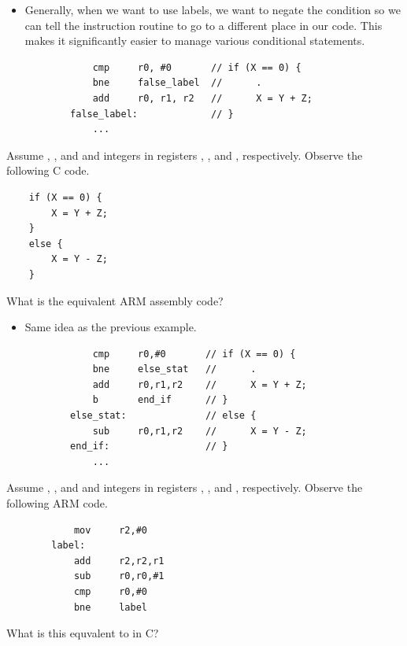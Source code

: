 \documentclass[letterpaper]{article}
\begin{document}
\begin{itemize}
    \item Generally, when we want to use labels, we want to negate the condition so we can tell the instruction routine to go to a different place in our code. This makes it significantly easier to manage various conditional statements. 
    \begin{verbatim}
            cmp     r0, #0       // if (X == 0) {
            bne     false_label  //      . 
            add     r0, r1, r2   //      X = Y + Z; 
        false_label:             // }
            ... 
    \end{verbatim}
\end{itemize}

\bigskip 
\bigskip 

Assume , , and  and integers in registers , , and , respectively. Observe the following C code.
\begin{verbatim}
    if (X == 0) {
        X = Y + Z;
    }
    else {
        X = Y - Z;
    }
\end{verbatim}
What is the equivalent ARM assembly code? 

\begin{itemize}
    \item Same idea as the previous example. 
    \begin{verbatim}
            cmp     r0,#0       // if (X == 0) {
            bne     else_stat   //      .
            add     r0,r1,r2    //      X = Y + Z;
            b       end_if      // }
        else_stat:              // else {
            sub     r0,r1,r2    //      X = Y - Z;
        end_if:                 // }
            ...                 

    \end{verbatim}
\end{itemize}

\bigskip 
\bigskip 

Assume , , and  and integers in registers , , and , respectively. Observe the following ARM code.
\begin{verbatim}
            mov     r2,#0
        label:
            add     r2,r2,r1
            sub     r0,r0,#1
            cmp     r0,#0
            bne     label 
\end{verbatim}
What is this equvalent to in C?
\end{document}
